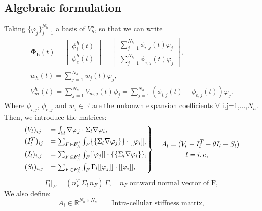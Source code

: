 \documentclass[a4paper,11pt]{article}
\begin{document}
    \subsection{Algebraic formulation}
    Taking $\{\varphi_j\}_{j=1}^{N_h}$ a basis of $V_h^n$, so that we can write
    \begin{equation*}
    \begin{gathered}
    \bm{\Phi_h}(t) = \begin{bmatrix} \phi_i^h(t) \\ \phi_e^h(t) \end{bmatrix} = \begin {bmatrix}\sum_{j=1}^{N_h} \phi_{i,j}(t)\varphi_j \\ \sum_{j=1}^{N_h} \phi_{e,j}(t)\varphi_j \end{bmatrix},\\
    w_h(t) = \sum_{j=1}^{N_h}w_j(t)\varphi_j,\\
    V_m^h(t)=\sum_{j=1}^{N_h} V_{m,j}(t) \phi_j=\sum_{j=1}^{N_h}(\phi_{i,j}(t)-\phi_{e,j}(t))\varphi_j.
 \end{gathered}
 \end{equation*}
 Where $\phi_{i,j}$, $\phi_{e,j}$ and $w_j \in \mathbb{R}$ are the unkonwn expansion coefficients $\forall$ i,j=1,...,$N_h$.
 Then, we introduce the matrices:
 \begin{equation*}
\begin{rcases}
(V_l)_{ij} &= \int_{\Omega}\nabla\varphi_j \cdot \Sigma_l \nabla \varphi_i,
\\ (I_l^T)_{ij} &= \sum_{F \in F_h^I} \int_{F} \{\{\Sigma_l \nabla\varphi_j\}\} \cdot [[\varphi_i]],
\\ (I_l)_{i,j} &= \sum_{F \in F_h^I} \int_{F} [[\varphi_j]] \cdot \{\{\Sigma_l \nabla \varphi_i\}\},
\\(S_l)_{i,j} &= \sum_{F \in F_h^I} \int_{F} \Gamma_l[[\varphi_j]] \cdot [[\varphi_i]],
\end{rcases}
\begin{gathered}
\quad A_l = (V_l -I_l^T - \theta I_l + S_l)\\
l=i,e, \\
\end{gathered}
\end{equation*}
\begin{equation*}
\Gamma_l\vert_F = (n_F^T \, \Sigma_l \, n_F) \,\Gamma, \quad n_F \text{ outward normal vector of F},
\end{equation*}
We also define:
\begin{equation*}
A_i \in \mathbb{R}^{N_h \times N_h} \qquad{\text{Intra-cellular stiffness matrix}},
\end{equation*}
\end{document}
